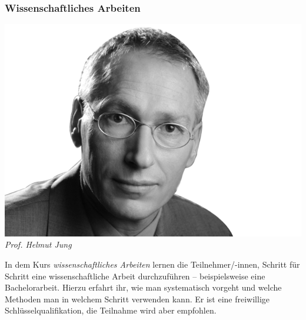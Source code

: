 \begin{multicols}{2}
\subsubsection{Wissenschaftliches Arbeiten}
	\includegraphics[width=0.9\linewidth]{bilder/dozenten/jung_frei.png}\\
	\textit{Prof. Helmut Jung}
	
	In dem Kurs \emph{wissenschaftliches Arbeiten} lernen die Teilnehmer/-innen, Schritt für Schritt eine wissenschaftliche Arbeit durchzuführen -- beispielsweise eine Bachelorarbeit. Hierzu erfahrt ihr, wie man systematisch vorgeht und welche Methoden man in welchem Schritt verwenden kann. Er ist eine freiwillige Schlüsselqualifikation, die Teilnahme wird aber empfohlen.
\end{multicols}
